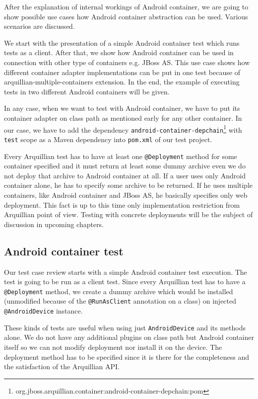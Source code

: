\documentclass[12pt,final,oneside]{fithesis}
\begin{document}
After the explanation of internal workings of Android container, we are going to show possible use cases how Android container abstraction can be used. Various scenarios are discussed.

We start with the presentation of a simple Android container test which runs tests as a client. After that, we show how Android container can be used in connection with other type of containers e.g. JBoss AS. This use case shows how different container adapter implementations can be put in one test because of arquillian-multiple-containers extension. In the end, the example of executing tests in two different Android containers will be given.

In any case, when we want to test with Android container, we have to put its container adapter on class path as mentioned early for any other container. In our case, we have to add the dependency \texttt{android-container-depchain}\footnote{org.jboss.arquillian.container:android-container-depchain:pom} with \texttt{test} scope as a Maven dependency into \texttt{pom.xml} of our test project.

Every Arquillian test has to have at least one \texttt{@Deployment} method for some container specified and it must return at least some dummy archive even we do not deploy that archive to Android container at all. If a user uses only Android container alone, he has to specify some archive to be returned. If he uses multiple containers, like Android container and JBoss AS, he basically specifies only web deployment. This fact is up to this time only implementation restriction from Arquillian point of view. Testing with concrete deployments will be the subject of discussion in upcoming chapters.

		\subsection{Android container test}

Our test case review starts with a simple Android container test execution. The test is going to be run as a client test. Since every Arquillian test has to have a \texttt{@Deployment} method, we create a dummy archive which would be installed (unmodified because of the \texttt{@RunAsClient} annotation on a class) on  injected \texttt{@AndroidDevice} instance.

These kinds of tests are useful when using just \texttt{AndroidDevice} and its methods alone. We do not have any additional plugins on class path but Android container itself so we can not modify deployment nor install it on the device. The deployment method has to be specified since it is there for the completeness and the satisfaction of the Arquillian API.
\end{document}
